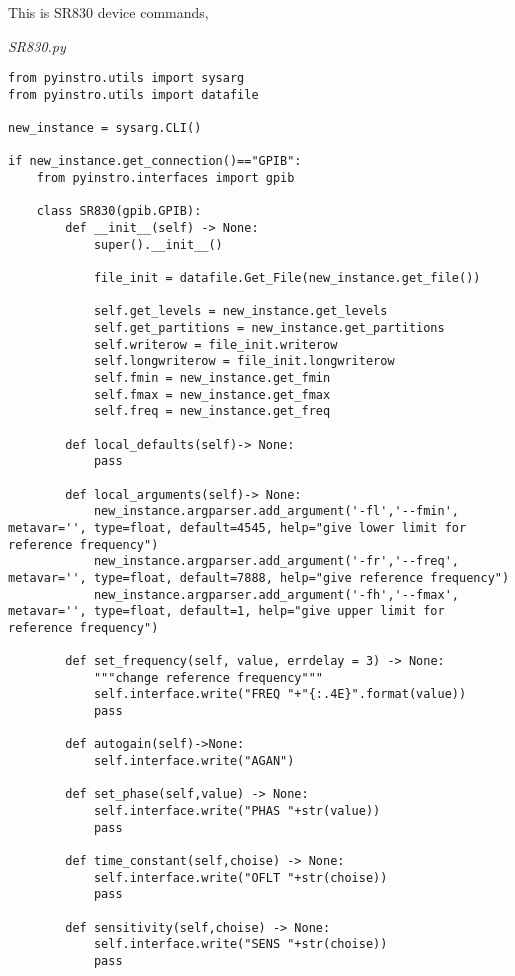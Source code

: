 This is SR830 device commands,

\emph{SR830.py}
\begin{verbatim}
from pyinstro.utils import sysarg
from pyinstro.utils import datafile

new_instance = sysarg.CLI()

if new_instance.get_connection()=="GPIB":
    from pyinstro.interfaces import gpib
    
    class SR830(gpib.GPIB):
        def __init__(self) -> None:
            super().__init__()

            file_init = datafile.Get_File(new_instance.get_file())
            
            self.get_levels = new_instance.get_levels
            self.get_partitions = new_instance.get_partitions
            self.writerow = file_init.writerow
            self.longwriterow = file_init.longwriterow
            self.fmin = new_instance.get_fmin
            self.fmax = new_instance.get_fmax
            self.freq = new_instance.get_freq

        def local_defaults(self)-> None:
            pass

        def local_arguments(self)-> None:
            new_instance.argparser.add_argument('-fl','--fmin', metavar='', type=float, default=4545, help="give lower limit for reference frequency")
            new_instance.argparser.add_argument('-fr','--freq', metavar='', type=float, default=7888, help="give reference frequency")
            new_instance.argparser.add_argument('-fh','--fmax', metavar='', type=float, default=1, help="give upper limit for reference frequency")
    
        def set_frequency(self, value, errdelay = 3) -> None:
            """change reference frequency"""
            self.interface.write("FREQ "+"{:.4E}".format(value))
            pass

        def autogain(self)->None:
            self.interface.write("AGAN")

        def set_phase(self,value) -> None:
            self.interface.write("PHAS "+str(value))
            pass

        def time_constant(self,choise) -> None:
            self.interface.write("OFLT "+str(choise))
            pass

        def sensitivity(self,choise) -> None:
            self.interface.write("SENS "+str(choise))
            pass


\end{verbatim}
